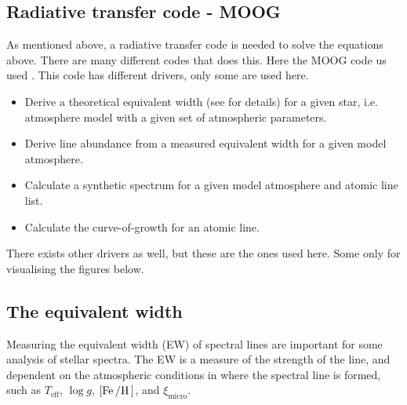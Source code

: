 \subsection{Radiative transfer code - MOOG}

As mentioned above, a radiative transfer code is needed to solve the equations
above. There are many different codes that does this. Here the MOOG code us used
\citep{Sneden1973}. This code has different drivers, only some are used here.

\begin{itemize}
  \item Derive a theoretical equivalent width (see  for details)
        for a given star, i.e. atmosphere model with a given set of atmospheric
        parameters.
  \item Derive line abundance from a measured equivalent width for a given model
        atmosphere.
  \item Calculate a synthetic spectrum for a given model atmosphere and atomic
        line list.
  \item Calculate the curve-of-growth for an atomic line.
\end{itemize}
There exists other drivers as well, but these are the ones used here. Some only
for visualising the figures below.



\subsection{The equivalent width}
\label{sec:EW}

Measuring the equivalent width (EW) of spectral lines are important for some
analysis of stellar spectra. The EW is a measure of the strength of the line,
and dependent on the atmospheric conditions in where the spectral line is
formed, such as $T_\mathrm{eff}$, $\log g$, $[\ion{Fe}/\ion{H}]$, and
$\xi_\mathrm{micro}$.

